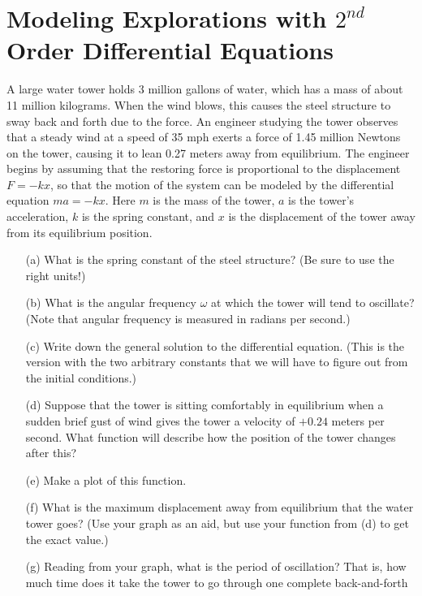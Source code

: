 \section{Modeling Explorations with $2^{nd}$ Order Differential Equations}
\begin{problem}
    A large water tower holds 3 million gallons of water, which has a mass of about 11
    million kilograms.  When the wind blows, this causes the steel structure to sway back
    and forth due to the force.  An engineer studying the tower observes that a steady
    wind at a speed of 35 mph exerts a force of 1.45 million Newtons on the tower, causing
    it to lean 0.27 meters away from equilibrium.  The engineer begins by assuming that
    the restoring force is proportional to the displacement $F = - k x$, so that the motion
    of the system can be modeled by the differential equation $m a = -k x$.  Here $m$ is the
    mass of the tower, $a$ is the tower's acceleration, $k$ is the spring constant, and $x$ is
    the displacement of the tower away from its equilibrium position.
    \begin{enumerate}
        \item[(a)] What is the spring constant of the steel structure?  (Be sure to
            use the right units!)
        \item[(b)] What is the angular frequency $\omega$ at which the tower will tend to oscillate?
            (Note that angular frequency is measured in radians per second.)
        \item[(c)] Write down the general solution to the differential equation.  (This is
            the version with the two arbitrary constants that we will have to figure out
            from the initial conditions.)
        \item[(d)] Suppose that the tower is sitting comfortably in equilibrium when a sudden
            brief gust of wind gives the tower a velocity of $+0.24$ meters per second.
            What function will describe how the position of the tower changes after this?
        \item[(e)] Make a plot of this function.
        \item[(f)] What is the maximum displacement away from equilibrium that the water
            tower goes? (Use your graph as an aid, but use your function from (d) to get
            the exact value.)
        \item[(g)] Reading from your graph, what is the period of oscillation?  That is, how
            much time does it take the tower to go through one complete back-and-forth

\end{enumerate}
\end{problem}
